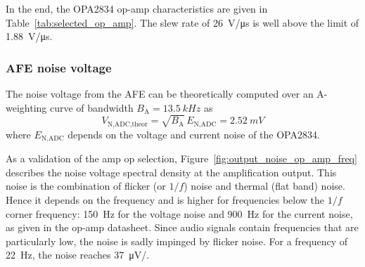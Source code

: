 \documentclass{EPL-master-thesis-covers-EN}
\newcommand{\te}[1]{\textrm{#1}}
\begin{document}

In the end, the OPA2834 op-amp characteristics are given in Table~\ref{tab:selected_op_amp}. The slew rate of \SI{26}{V/\micro s} is well above the limit of \SI{1.88}{V/\micro s}.

\begin{table}[H]
\centering
{}
\caption{Characteristics of the selected operational amplifier: OPA2834}
\label{tab:selected_op_amp}
\end{table}


\subsubsection*{AFE noise voltage}

The noise voltage from the AFE can be theoretically computed over an A-weighting curve of bandwidth $B_\te{A} = \SI{13.5}{kHz}$ as
\[
 V_\te{N,ADC,theor} = \sqrt{B_\te{A}} \, E_\te{N,ADC} = \SI{2.52}{mV}
\]
where $E_\te{N,ADC}$ depends on the voltage and current noise of the OPA2834.

As a validation of the amp op selection, Figure~\ref{fig:output_noise_op_amp_freq} describes the noise voltage spectral density at the amplification output. 
This noise is the combination of flicker (or $1/f$) noise and thermal (flat band) noise. Hence it depends on the frequency and is higher for frequencies below the $1/f$ corner frequency: \SI{150}{Hz} for the voltage noise and \SI{900}{Hz} for the current noise, as given in the op-amp datasheet. Since audio signals contain frequencies that are particularly low, the noise is sadly impinged by flicker noise. For a frequency of \SI{22}{Hz}, the noise reaches \SI{37}{\micro V/}.
\end{document}
